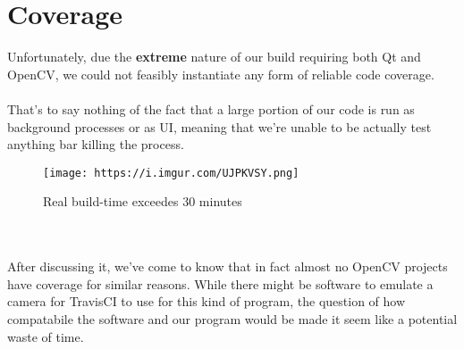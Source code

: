 \documentclass[12pt]{article}
\begin{document}
\section*{Coverage}
Unfortunately, due the \textbf{extreme} nature of our build requiring both Qt and OpenCV, we could not feasibly instantiate any form of reliable code coverage.\\
\\
That's to say nothing of the fact that a large portion of our code is run as background processes or as UI, meaning that we're unable to be actually test anything bar killing the process.
\\\begin{figure}[width=0.25\textwidth]
    \centering
    \texttt{[image: https://i.imgur.com/UJPKVSY.png]}
    \caption{Real build-time exceedes 30 minutes}
\end{figure}
\\
\\After discussing it, we've come to know that in fact almost no OpenCV projects have coverage for similar reasons. While there might be software to emulate a camera for TravisCI to use for this kind of program, the question of how compatabile the software and our program would be made it seem like a potential waste of time.
\pagebreak
\end{document}
